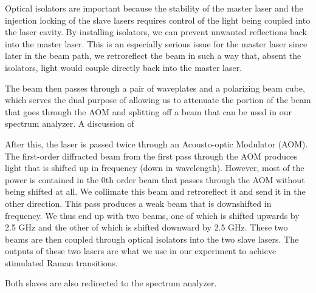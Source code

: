 Optical isolators are important because the stability of the master laser and the injection locking of the slave lasers requires control of the light being coupled into the laser cavity. By installing isolators, we can prevent unwanted reflections back into the master laser. This is an especially serious issue for the master laser since later in the beam path, we retroreflect the beam in such a way that, absent the isolators, light would couple directly back into the master laser. 

The beam then passes through a pair of waveplates and a polarizing beam cube, which serves the dual purpose of allowing us to attenuate the portion of the beam that goes through the AOM and splitting off a beam that can be used in our spectrum analyzer. A discussion of 

After this, the laser is passed twice through an Acousto-optic Modulator (AOM). The first-order diffracted beam from the first pass through the AOM produces light that is shifted up in frequency (down in wavelength). However, most of the power is contained in the 0th order beam that passes through the AOM without being shifted at all. We collimate this beam and retroreflect it and send it in the other direction. This pass produces a weak beam that is downshifted in frequency. We thus end up with two beams, one of which is shifted upwards by 2.5 GHz and the other of which is shifted downward by 2.5 GHz. These two beams are then coupled through optical isolators into the two slave lasers. The outputs of these two lasers are what we use in our experiment to achieve stimulated Raman transitions. 


Both slaves are also redirected to the spectrum analyzer. 

